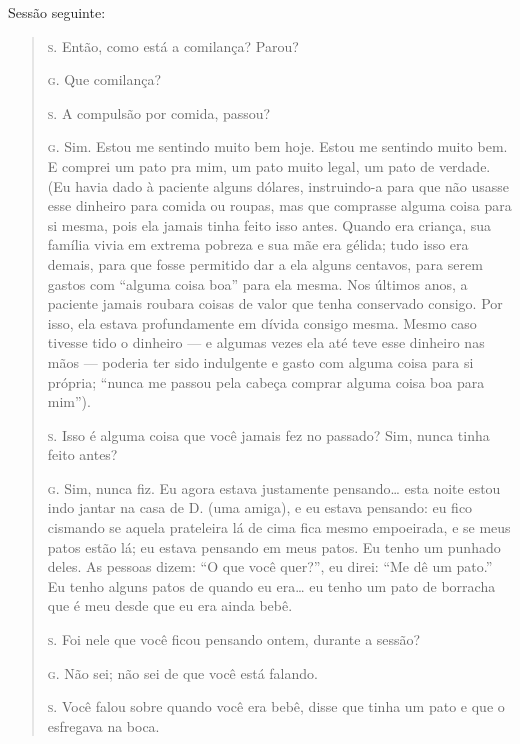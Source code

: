 \bigskip

Sessão seguinte:

\bigskip

\begin{quote}

\noindent\hskip0mm\textsc{s.} Então, como está a comilança? Parou?

\noindent\hskip0mm\textsc{g.} Que comilança?

\noindent\hskip0mm\textsc{s.} A compulsão por comida, passou?

\noindent\hskip0mm\textsc{g.} Sim. Estou me sentindo muito bem hoje. Estou me sentindo muito bem.
E comprei um pato pra mim, um pato muito legal, um pato de verdade.
(Eu havia dado à paciente alguns dólares, instruindo-a para que não
usasse esse dinheiro para comida ou roupas, mas que comprasse alguma
coisa para si mesma, pois ela jamais tinha feito isso antes. Quando era
criança, sua família vivia em extrema pobreza e sua mãe era gélida;
tudo isso era demais, para que fosse permitido dar a ela alguns
centavos, para serem gastos com ``alguma coisa
boa'' para ela mesma. Nos últimos anos, a paciente jamais
roubara coisas de valor que tenha conservado consigo. Por isso, ela
estava profundamente em dívida consigo mesma. Mesmo caso tivesse tido o
dinheiro --- e algumas vezes ela até teve esse dinheiro nas mãos ---
poderia ter sido indulgente e gasto com alguma coisa para si própria;
``nunca me passou pela cabeça comprar alguma coisa boa
para mim'').

\noindent\hskip0mm\textsc{s.} Isso é alguma coisa que você jamais fez no passado? Sim, nunca tinha
feito antes?

\noindent\hskip0mm\textsc{g.} Sim, nunca fiz. Eu agora estava justamente pensando\ldots{} esta noite
estou indo jantar na casa de D. (uma amiga), e eu estava pensando: eu
fico cismando se aquela prateleira lá de cima fica mesmo empoeirada, e
se meus patos estão lá; eu estava pensando em meus patos. Eu tenho um
punhado deles. As pessoas dizem: ``O que você
quer?'', eu direi: ``Me dê um
pato.'' Eu tenho alguns patos de quando eu era\ldots{} eu tenho
um pato de borracha que é meu desde que eu era ainda bebê.

\noindent\hskip0mm\textsc{s.} Foi nele que você ficou pensando ontem, durante a sessão?

\noindent\hskip0mm\textsc{g.} Não sei; não sei de que você está falando.

\noindent\hskip0mm\textsc{s.} Você falou sobre quando você era bebê, disse que tinha um pato e que
o esfregava na boca.


\end{quote}

